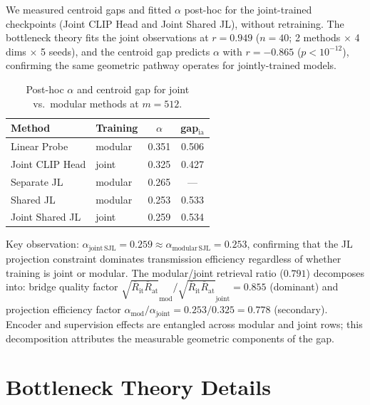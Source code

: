 \documentclass{article}
\newcommand{\avgR}{\overline{R}}
\begin{document}
We measured centroid gaps and fitted $\alpha$ post-hoc for the joint-trained checkpoints (Joint CLIP Head and Joint Shared JL), without retraining.
The bottleneck theory fits the joint observations at $r=0.949$ ($n=40$; 2 methods $\times$ 4 dims $\times$ 5 seeds), and the centroid gap predicts $\alpha$ with $r=-0.865$ ($p<10^{-12}$), confirming the same geometric pathway operates for jointly-trained models.

\begin{table}[ht]
  \caption{Post-hoc $\alpha$ and centroid gap for joint vs.\ modular methods at $m=512$.}
  \label{tab:joint_alpha}
  \centering
  \begin{tabular}{llcc}
    \toprule
    Method & Training & $\alpha$ & gap$_\mathrm{ia}$ \\
    \midrule
    Linear Probe      & modular & 0.351 & 0.506 \\
    Joint CLIP Head   & joint   & 0.325 & 0.427 \\
    Separate JL       & modular & 0.265 & --- \\
    Shared JL         & modular & 0.253 & 0.533 \\
    Joint Shared JL   & joint   & 0.259 & 0.534 \\
    \bottomrule
  \end{tabular}
\end{table}

Key observation: $\alpha_\mathrm{joint\,SJL}=0.259 \approx \alpha_\mathrm{modular\,SJL}=0.253$, confirming that the JL projection constraint dominates transmission efficiency regardless of whether training is joint or modular.
The modular/joint retrieval ratio ($0.791$) decomposes into: bridge quality factor $\sqrt{\avgR_\mathrm{it}\avgR_\mathrm{at}}_\mathrm{mod}/\sqrt{\avgR_\mathrm{it}\avgR_\mathrm{at}}_\mathrm{joint}=0.855$ (dominant) and projection efficiency factor $\alpha_\mathrm{mod}/\alpha_\mathrm{joint}=0.253/0.325=0.778$ (secondary).
Encoder and supervision effects are entangled across modular and joint rows; this decomposition attributes the measurable geometric components of the gap.

\section{Bottleneck Theory Details}
\label{app:theory}
\label{app:theory_details}
\end{document}
